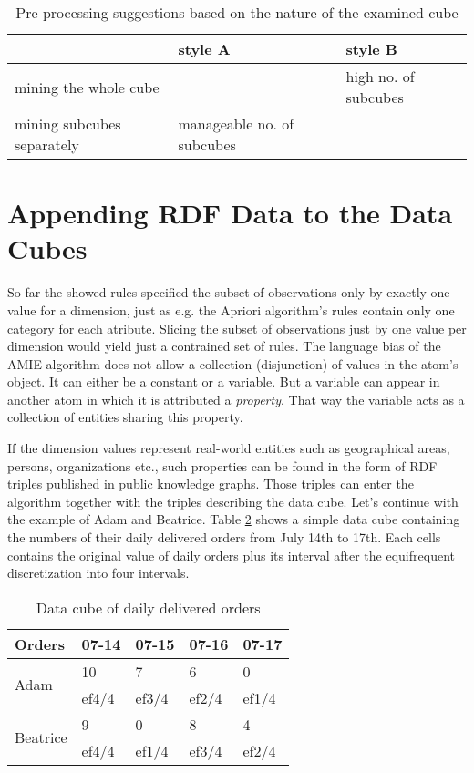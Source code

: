 \begin{table}[h]
\centering
\begin{tabular}{l|ll}
                           & style A                       & style B                  \\ 
\hline
mining the whole cube      &                              & high no. of subcubes  \\
mining subcubes separately & manageable no. of subcubes &                         
\end{tabular}
\caption{Pre-processing suggestions based on the nature of the examined cube}\label{table6}
\end{table}

\section{Appending RDF Data to the Data Cubes}

So far the showed rules specified the subset of observations only by exactly one value for a dimension, just as e.g. the Apriori algorithm's rules contain only one category for each atribute. Slicing the subset of observations just by one value per dimension would yield just a contrained set of rules. The language bias of the AMIE algorithm does not allow a collection (disjunction) of values in the atom's object. It can either be a constant or a variable. But a variable can appear in another atom in which it is attributed a \textit{property}. That way the variable acts as a collection of entities sharing this property.

If the dimension values represent real-world entities such as geographical areas, persons, organizations etc., such properties can be found in the form of RDF triples published in public knowledge graphs. Those triples can enter the algorithm together with the triples describing the data cube. Let's continue with the example of Adam and Beatrice. Table \ref{table7} shows a simple data cube containing the numbers of their daily delivered orders from July 14th to 17th. Each cells contains the original value of daily orders plus its interval after the equifrequent discretization into four intervals.

\begin{table}[h]
\centering
\begin{tabular}{l|llll}
Orders                    & 07-14 & 07-15 & 07-16 & 07-17  \\ 
\hline
\multirow{2}{*}{Adam}     & 10    & 7     & 6     & 0      \\
                         & ef4/4 & ef3/4 & ef2/4 & ef1/4  \\
\multirow{2}{*}{Beatrice} & 9     & 0     & 8     & 4      \\
                          & ef4/4 & ef1/4 & ef3/4 & ef2/4 
\end{tabular}
\caption{Data cube of daily delivered orders}\label{table7}
\end{table}

